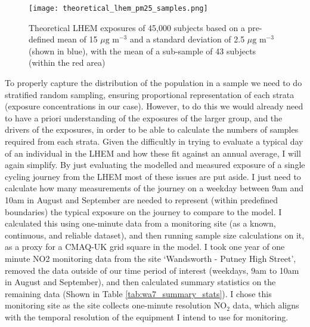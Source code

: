 \begin{figure}[H]
\centering
\texttt{[image: theoretical\_lhem\_pm25\_samples.png]}
\caption{Theoretical LHEM exposures of 45,000 subjects based on a pre-defined mean of 15 $\mu \text{g m}^{-3}$ and a standard deviation of 2.5 $\mu \text{g m}^{-3}$ (shown in blue), with the mean of a sub-sample of 43 subjects (within the red area)}
\label{fig:theoretical_lhem_pm25_samples}
\end{figure}

To properly capture the distribution of the population in a sample we need to do stratified random sampling, ensuring proportional representation of each strata (exposure concentrations in our case).  However, to do this we would already need to have a priori understanding of the exposures of the larger group, and the drivers of the exposures, in order to be able to calculate the numbers of samples required from each strata.
Given the difficultly in trying to evaluate a typical day of an individual in the LHEM and how these fit against an annual average, I will again simplify. By just evaluating the modelled and measured exposure of a single cycling journey from the LHEM most of these issues are put aside. I just need to calculate how many measurements of the journey on a weekday between 9am and 10am in August and September are needed to represent (within predefined boundaries) the typical exposure on the journey to compare to the model.
I calculated this using one-minute data from a monitoring site (as a known, continuous, and reliable dataset), and then running sample size calculations on it, as a proxy for a CMAQ-UK grid square in the model. I took one year of one minute NO2 monitoring data from the site ‘Wandsworth - Putney High Street’, removed the data outside of our time period of interest (weekdays, 9am to 10am in August and September), and then calculated summary statistics on the remaining data (Shown in Table \ref{tab:wa7_summary_stats}). I chose this monitoring site as the site collects one-minute resolution NO$_{2}$ data, which aligns with the temporal resolution of the equipment I intend to use for monitoring.


